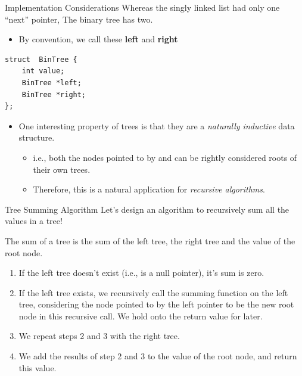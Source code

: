 \documentclass[11pt]{beamer}
\let\OldTexttt\texttt
\renewcommand{\texttt}[1]{\OldTexttt{\color{teal}{#1}}}
\begin{document}
\begin{frame}[fragile=singleslide]{Implementation Considerations}
Whereas the singly linked list had only one ``next'' pointer, The binary tree has two.
\begin{itemize}
\item By convention, we call these \textbf{left} and \textbf{right}
\end{itemize}
\begin{lstlisting}[style=C]
struct  BinTree {
	int value;
	BinTree *left;
	BinTree *right;
};
\end{lstlisting} 
\begin{itemize}
\item One interesting property of trees is that they are a \emph{naturally inductive} data structure.
\begin{itemize}
\item i.e., both the nodes pointed to by \texttt{left} and \texttt{right} can be rightly considered roots of their own trees.  
\item Therefore, this is a natural application for \emph{recursive algorithms}.
\end{itemize}
\end{itemize}
\end{frame}

\begin{frame}[fragile=singleslide]{Tree Summing Algorithm}
Let's design an algorithm to recursively sum all the values in a tree!

The sum of a tree is the sum of the left tree, the right tree and the value of the root node.
\begin{enumerate}
\item If the left tree doesn't exist (i.e., is a null pointer), it's sum is zero.
\item If the left tree exists, we recursively call the summing function on the left tree, considering the node pointed to by the left pointer to be the new root node in this recursive call.  We hold onto the return value for later.
\item We repeat steps 2 and 3 with the right tree.
\item We add the results of step 2 and 3 to the value of the root node, and return this value. 
\end{enumerate}
\end{frame}
\end{document}

